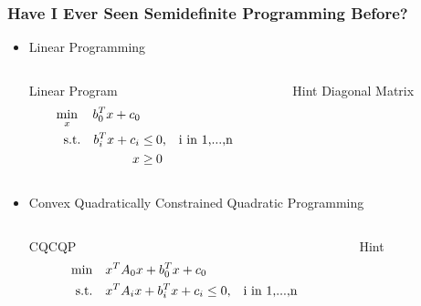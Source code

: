 \documentclass[11pt]{beamer}
\begin{document}
	\begin{frame}
		\frametitle{Have I Ever Seen Semidefinite Programming Before?}
		\begin{itemize}[leftmargin=-0.3cm]
		\item Linear Programming\\
		\begin{columns}
			\begin{column}{0.5\textwidth}
				\begin{block}{Linear Program}
					\scriptsize
					\abovedisplayskip=0pt
					\abovedisplayshortskip=0pt 
					\belowdisplayskip=0pt
					\belowdisplayshortskip=0pt 
					\begin{equation*}
					\begin{aligned}
					\min_x\quad  b_0^Tx+c_0\quad\\
					\text{s.t.}\quad  b_i^Tx+c_i\leq&  \:0\text{,\quad i in 1,...,n}\\
					 x\geq& \:0
					\end{aligned}
					\end{equation*}
				\end{block}
			\end{column}
			\begin{column}{0.5\textwidth}
				\begin{block}{Hint}
					Diagonal Matrix
				\end{block}
			\end{column}
		\end{columns}
		\item Convex Quadratically Constrained Quadratic Programming\\
		\begin{columns}
		\begin{column}{0.5\textwidth}
		\begin{block}{CQCQP}
		\scriptsize
		\abovedisplayskip=0pt
		\abovedisplayshortskip=0pt 
		\belowdisplayskip=0pt
		\belowdisplayshortskip=0pt 
		\begin{equation*}
		\begin{aligned}
		\min\quad &x^TA_0x+b_0^Tx+c_0\\
		\text{s.t.}\quad &x^TA_ix+b_i^Tx+c_i\leq 0\text{,\quad i in 1,...,n}
		\end{aligned}
		\end{equation*}
		\end{block}
		\end{column}
		\begin{column}{0.5\textwidth}
			\begin{block}{Hint}

\end{block}
\end{column}
\end{columns}
\end{itemize}
\end{frame}
\end{document}
